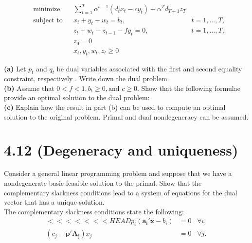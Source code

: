 \documentclass{article}
\begin{document}
\begin{equation*}
\begin{aligned}
& \text{minimize} && \displaystyle \sum_{t=1}^T \alpha^{t-1} (d_t x_t - c y_t) + \alpha^T d_{T+1} z_T\\
& \text{subject to} && x_t + y_t - w_t = b_t, \; & t = 1, \dots, T, \\
&&& z_t + w_t - z_{t-1} - fy_t = 0, & t = 1, \dots, T, \\
&&& z_0 = 0 \\
&&& x_t, y_t, w_t, z_t \geq 0
\end{aligned}
\end{equation*}

\noindent \textbf{(a)} Let $p_t$ and $q_t$ be dual variables associated with the first and second equality constraint, respectively .  Write down the dual problem. \\

\noindent \textbf{(b)} Assume that $ 0 < f < 1, b_t \geq 0, \text{and } c \geq 0$.  Show that the following formulae provide an optimal solution to the dual problem: \\

\noindent \textbf{(c)} Explain how the result in part (b) can be used to compute an optimal solution to the original problem.  Primal and dual nondegeneracy can be assumed. \\



\section*{4.12 (Degeneracy and uniqueness)}
Consider a general linear programming problem and suppose that we have a nondegenerate basic feasible solution to the primal.  Show that the complementary slackness conditions lead to a system of equations for the dual vector that has a unique solution.\\

\noindent
The complementary slackness conditions state the following:\\

\begin{equation*}
\begin{aligned}
<<<<<<< HEAD
p_i (\mathbf{a_i'x} - b_i) & = 0 \; \; \; \forall i, \\
(c_j - \mathbf{p' A_j}) x_j & = 0 \; \; \; \forall j.
\end{aligned}
\end{equation*}
\end{document}
